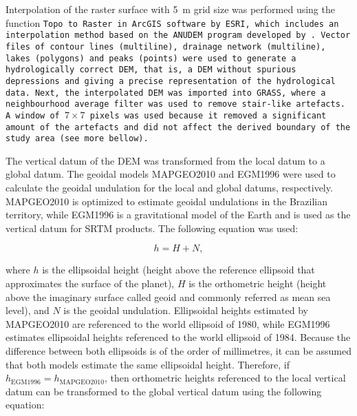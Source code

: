 
Interpolation of the raster surface with \SI{5}{\metre} grid size was performed using the function \tt{Topo 
to Raster} in ArcGIS\textregistered{} software by ESRI, which includes an interpolation method based on the 
ANUDEM program developed by . Vector files of contour lines (\tt{multiline}), 
drainage network (\tt{multiline}), lakes (\tt{polygons}) and peaks (\tt{points}) were used to generate a 
hydrologically correct DEM, that is, a DEM without spurious depressions and giving a precise representation 
of the hydrological data. Next, the interpolated DEM was imported into GRASS, where a neighbourhood average 
filter was used to remove stair-like artefacts. A window of $7 \times 7$ pixels was used because it removed a 
significant amount of the artefacts and did not affect the derived boundary of the study area (see more 
bellow).

The vertical datum of the DEM was transformed from the local datum to a global datum. The geoidal models 
MAPGEO2010 \cite{IBGE2010a} and EGM1996 \cite{LemoineEtAl1998} were used to calculate the geoidal undulation 
for the local and global datums, respectively. MAPGEO2010 is optimized to estimate geoidal undulations in the 
Brazilian territory, while EGM1996 is a gravitational model of the Earth and is used as the vertical datum for 
SRTM products. The following equation was used:

\begin{equation}
 \label{eq:geoidal}
 h = H + N,
\end{equation}

\noindent where $h$ is the ellipsoidal height (height above the reference ellipsoid that approximates the 
surface of the planet), $H$ is the orthometric height (height above the imaginary surface called geoid and 
commonly referred as mean sea level), and $N$ is the geoidal undulation. Ellipsoidal heights estimated by 
MAPGEO2010 are referenced to the world ellipsoid of 1980, while EGM1996 estimates ellipsoidal heights 
referenced to the world ellipsoid of 1984. Because the difference between both ellipsoids is of the order of 
millimetres, it can be assumed that both models estimate the same ellipsoidal height. Therefore, if 
$h_{\text{EGM1996}} = h_{\text{MAPGEO2010}}$, then orthometric heights referenced to the local vertical datum 
can be transformed to the global vertical datum using the following equation:

